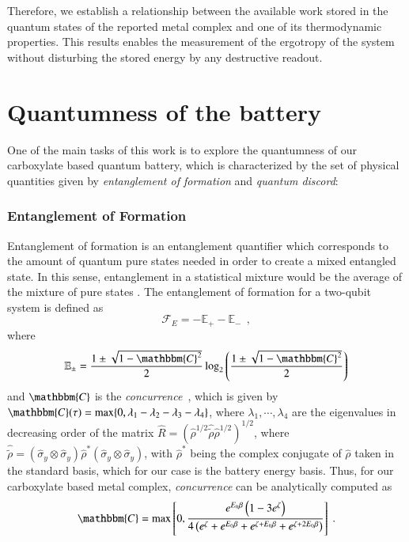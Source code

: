 \documentclass[aps,prl,epsfigure,twocolumn,superscriptaddress]{revtex4-1}
\newcommand{\Fcal}{\mathcal{F}}
\newcommand{\1}{\mathbbm{1}}
\begin{document}
Therefore, we establish a relationship between the available work stored in the quantum states of the reported metal complex and one of its thermodynamic properties. This results enables the measurement of the ergotropy of the system without disturbing the stored energy by any destructive readout.

\section{Quantumness of the battery}

One of the main tasks of this work is to explore the quantumness of our carboxylate based quantum battery, which is characterized by the set of physical quantities given by \textit{entanglement of formation} and \textit{quantum discord}:

\subsubsection{Entanglement of Formation}

Entanglement of formation is an entanglement quantifier which corresponds to the amount of quantum pure states needed in order to create a mixed entangled state. In this sense, entanglement in a statistical mixture would be the average of the mixture of pure states \cite{Hill:97,Wootters:98}. The entanglement of formation for a two-qubit system is defined as \cite{cruz,cruz2017influence}
\begin{equation}
\Fcal_{E}=-\mathbb{E}_+-\mathbb{E}_- ~~,
\label{entanglement}
\end{equation}
where 
\begin{equation}
\mathbb{E}_\pm=\frac{1\pm\sqrt{1-\mathbbm{C}^2}}{2}\log_2 \left(\frac{1\pm\sqrt{1-\mathbbm{C}^2}}{2}\right)
\end{equation}
and $\mathbbm{C}$ is the \textit{concurrence}~\cite{Hill:97,Wootters:98}, which is given by $\mathbbm{C}(\tau) = \max \{ 0, \lambda_{1} - \lambda_{2} - \lambda_{3} - \lambda_{4}\}$, where $\lambda_{1},\cdots,\lambda_{4}$ are the eigenvalues in decreasing order of the matrix $\hat R\!=\! ( \hat\rho^{1/2}\hat{\tilde{\rho}}\hat\rho^{1/2} )^{1/2}$, where $\hat{\tilde{\rho}}\!=\!(\hat\sigma_{y}\otimes \hat\sigma_{y}) \hat\rho^{*} (\hat\sigma_{y}\otimes \hat\sigma_{y})$, with $\hat\rho^{*}$ being the complex conjugate of $\hat\rho$ taken in the standard basis, which for our case is the battery energy basis. Thus, for our carboxylate based metal complex, \textit{concurrence} can be analytically computed as
\begin{align}
\mathbbm{C} = \max \left[0 ,\frac{e^{E_{0}\beta} \left( 1 - 3 e^{{\zeta}} \right)}{4\left( e^{{\zeta}} + e^{E_{0}\beta} + e^{{\zeta}+E_{0}\beta} + e^{{\zeta}+2E_{0}\beta} \right)}\right]~.
\label{concurence}
\end{align} %
\end{document}
